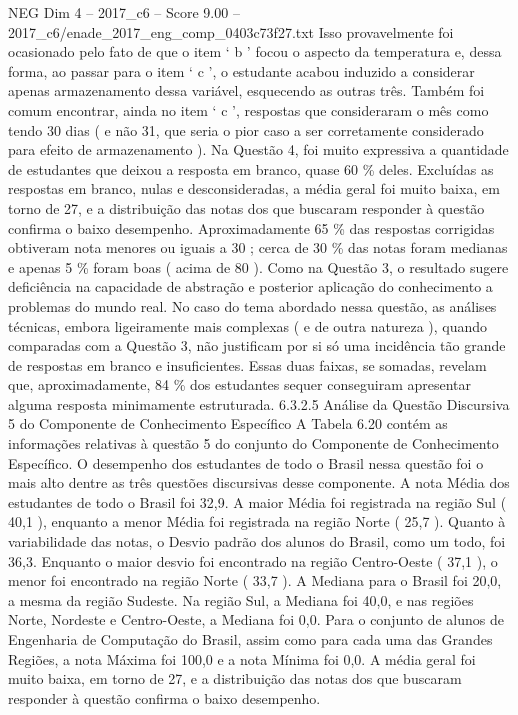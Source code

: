 \begin{textsample}{NEG Dim 4 – 2017\_c6 – Score 9.00 – 2017\_c6/enade\_2017\_eng\_comp\_0403c73f27.txt}
Isso provavelmente foi ocasionado pelo fato de que o item ‘ b ’ focou o aspecto da temperatura e, dessa forma, ao passar para o item ‘ c ’, o estudante acabou induzido a considerar apenas armazenamento dessa variável, esquecendo as outras três.
Também foi comum encontrar, ainda no item ‘ c ’, respostas que consideraram o mês como tendo 30 dias ( e não 31, que seria o pior caso a ser corretamente considerado para efeito de armazenamento ).
Na Questão 4, foi muito expressiva a quantidade de estudantes que deixou a resposta em branco, quase 60 \% deles.
Excluídas as respostas em branco, nulas e desconsideradas, a média geral foi muito baixa, em torno de 27, e a distribuição das notas dos que buscaram responder à questão confirma o baixo desempenho.
Aproximadamente 65 \% das respostas corrigidas obtiveram nota menores ou iguais a 30 ; cerca de 30 \% das notas foram medianas e apenas 5 \% foram boas ( acima de 80 ).
Como na Questão 3, o resultado sugere deficiência na capacidade de abstração e posterior aplicação do conhecimento a problemas do mundo real.
No caso do tema abordado nessa questão, as análises técnicas, embora ligeiramente mais complexas ( e de outra natureza ), quando comparadas com a Questão 3, não justificam por si só uma incidência tão grande de respostas em branco e insuficientes.
Essas duas faixas, se somadas, revelam que, aproximadamente, 84 \% dos estudantes sequer conseguiram apresentar alguma resposta minimamente estruturada. 6.3.2.5 Análise da Questão Discursiva 5 do Componente de Conhecimento Específico A Tabela 6.20 contém as informações relativas à questão 5 do conjunto do Componente de Conhecimento Específico.
O desempenho dos estudantes de todo o Brasil nessa questão foi o mais alto dentre as três questões discursivas desse componente.
A nota Média dos estudantes de todo o Brasil foi 32,9.
A maior Média foi registrada na região Sul ( 40,1 ), enquanto a menor Média foi registrada na região Norte ( 25,7 ).
Quanto à variabilidade das notas, o Desvio padrão dos alunos do Brasil, como um todo, foi 36,3.
Enquanto o maior desvio foi encontrado na região Centro-Oeste ( 37,1 ), o menor foi encontrado na região Norte ( 33,7 ).
A Mediana para o Brasil foi 20,0, a mesma da região Sudeste.
Na região Sul, a Mediana foi 40,0, e nas regiões Norte, Nordeste e Centro-Oeste, a Mediana foi 0,0.
Para o conjunto de alunos de Engenharia de Computação do Brasil, assim como para cada uma das Grandes Regiões, a nota Máxima foi 100,0 e a nota Mínima foi 0,0.
A média geral foi muito baixa, em torno de 27, e a distribuição das notas dos que buscaram responder à questão confirma o baixo desempenho.

\end{textsample}

